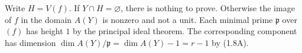 Write $H=V(f)$. If $Y\cap H=\varnothing$, there is nothing to prove. Otherwise the image of $f$ in the domain $A(Y)$ is nonzero and not a unit. Each minimal prime $\mathfrak p$ over $(f)$ has height $1$ by the principal ideal theorem. The corresponding component has dimension $\dim A(Y)/\mathfrak p=\dim A(Y)-1=r-1$ by (1.8A).
